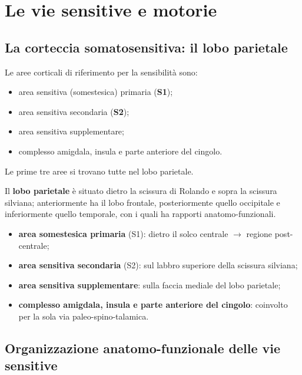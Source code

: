 \chapter{Le vie sensitive e motorie}

\section{La corteccia somatosensitiva: il lobo parietale}

Le aree corticali di riferimento per la sensibilità sono:
\begin{itemize}
  \item area sensitiva (somestesica) primaria (\textbf{S1});
  \item area sensitiva secondaria (\textbf{S2});
  \item area sensitiva supplementare;
  \item complesso amigdala, insula e parte anteriore del cingolo.
\end{itemize}
Le prime tre aree si trovano tutte nel lobo parietale.

Il \textbf{lobo parietale} è situato dietro la scissura di Rolando e sopra
la scissura silviana; anteriormente ha il lobo frontale, posteriormente
quello occipitale e inferiormente quello temporale, con i quali ha
rapporti anatomo-funzionali.

\begin{itemize}
  \item \textbf{area somestesica primaria} (S1): dietro il solco centrale
    $\rightarrow$ regione post-centrale;
  \item \textbf{area sensitiva secondaria} (S2): sul labbro superiore
    della scissura silviana;
  \item \textbf{area sensitiva supplementare}: sulla faccia mediale del
    lobo parietale;
  \item \textbf{complesso amigdala, insula e parte anteriore del
    cingolo}: coinvolto per la sola via paleo-spino-talamica.
\end{itemize}

\section{Organizzazione anatomo-funzionale delle vie sensitive}

